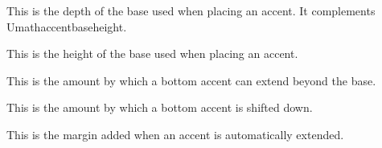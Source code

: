 


\stopnewprimitive

\startnewprimitive[title={\prm {Umathaccentbasedepth}}]

This is the depth of the base used when placing an accent. It complements \prm
{Umathaccentbaseheight}.

\stopnewprimitive

\startnewprimitive[title={\prm {Umathaccentbaseheight}}]

This is the height of the base used when placing an accent.

\stopnewprimitive

\startnewprimitive[title={\prm {Umathaccentbottomovershoot}}]

This is the amount by which a bottom accent can extend beyond the base.

\stopnewprimitive

\startnewprimitive[title={\prm {Umathaccentbottomshiftdown}}]

This is the amount by which a bottom accent is shifted down.

\stopnewprimitive

\startnewprimitive[title={\prm {Umathaccentextendmargin}}]

This is the margin added when an accent is automatically extended.

\stopnewprimitive

